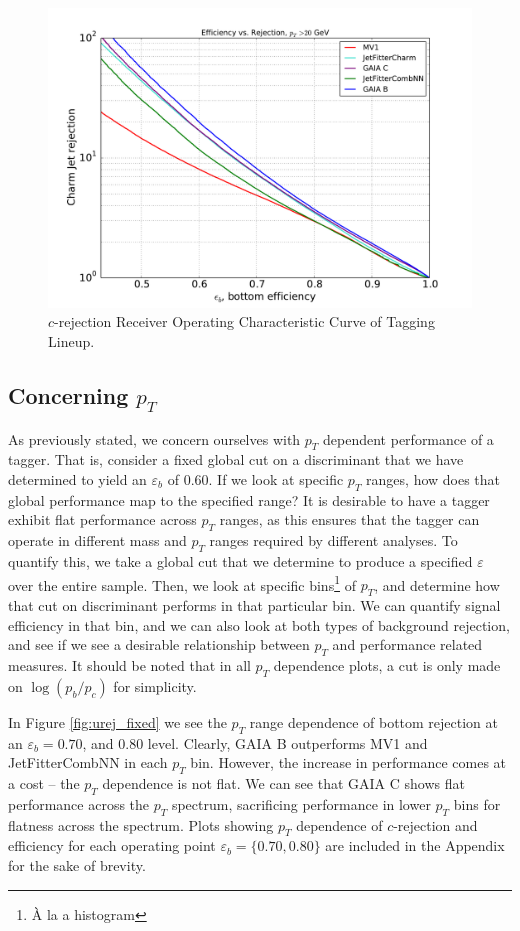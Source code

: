 \begin{figure}[h]
\includegraphics[width=\textwidth]{figures/btag/c_rej_ROC.pdf}
\caption[The ATLAS detector]{$c$-rejection Receiver Operating Characteristic Curve of Tagging Lineup.
\label{fig:crejROC}}
\end{figure}

\newcommand{\pt}{$p_T$ }
\subsection{Concerning \pt}


As previously stated, we concern ourselves with $p_T$ dependent performance of a tagger. That is, consider a fixed global cut on a discriminant that we have determined to yield an $\varepsilon_b$ of 0.60. If we look at specific $p_T$ ranges, how does that global performance map to the specified range? It is desirable to have a tagger exhibit flat performance across $p_T$ ranges, as this ensures that the tagger can operate in different mass and $p_T$ ranges required by different analyses. To quantify this, we take a global cut that we determine to produce a specified $\varepsilon$ over the entire sample. Then, we look at specific bins\footnote{\`{A} la a histogram} of $p_T$, and determine how that cut on discriminant performs in that particular bin. We can quantify signal efficiency in that bin, and we can also look at both types of background rejection, and see if we see a desirable relationship between $p_T$ and performance related measures. It should be noted that in all \pt dependence plots, a cut is only made on $\log(p_b/p_c)$ for simplicity.


In Figure \ref{fig:urej_fixed} we see the \pt range dependence of bottom rejection at an $\varepsilon_b =  0.70$, and 0.80 level. Clearly, GAIA B outperforms MV1 and JetFitterCombNN in each \pt bin. However, the increase in performance comes at a cost -- the \pt dependence is not flat. We can see that GAIA C shows flat performance across the \pt spectrum, sacrificing performance in lower \pt bins for flatness across the spectrum. Plots showing \pt dependence of $c$-rejection and efficiency for each operating point $\varepsilon_b = \{0.70, 0.80\}$ are included in the Appendix for the sake of brevity. 


